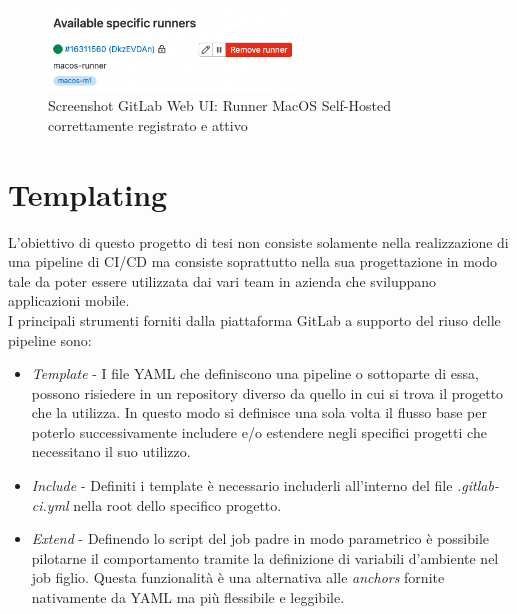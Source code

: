 \begin{figure}[H]
\centering
\includegraphics[width=0.6\textwidth]{img/Screenshot 2022-07-07 at 11.40.13.png}
\caption{Screenshot GitLab Web UI: Runner MacOS Self-Hosted correttamente registrato e attivo}
\end{figure}

\section{Templating}
L'obiettivo di questo progetto di tesi non consiste solamente nella realizzazione di una pipeline di CI/CD ma consiste soprattutto nella sua progettazione in modo tale da poter essere utilizzata dai vari team in azienda che sviluppano applicazioni mobile.\\
I principali strumenti forniti dalla piattaforma GitLab a supporto del riuso delle pipeline sono:
\begin{itemize}
    \item \textit{Template} - I file YAML che definiscono una pipeline o sottoparte di essa, possono risiedere in un repository diverso da quello in cui si trova il progetto che la utilizza. In questo modo si definisce una sola volta il flusso base per poterlo successivamente includere e/o estendere negli specifici progetti che necessitano il suo utilizzo.
    \item \textit{Include} - Definiti i template è necessario includerli all'interno del file \textit{.gitlab-ci.yml} nella root dello specifico progetto.
    \item \textit{Extend} - Definendo lo script del job padre in modo parametrico è possibile pilotarne il comportamento tramite la definizione di variabili d'ambiente nel job figlio. Questa funzionalità è una alternativa alle \textit{anchors} fornite nativamente da YAML ma più flessibile e leggibile. 
\end{itemize}

